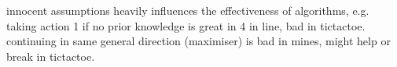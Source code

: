 innocent assumptions heavily influences the effectiveness of algorithms, e.g. taking action 1 if no prior knowledge is great in 4 in line, bad in tictactoe. continuing in same general direction (maximiser) is bad in mines, might help or break in tictactoe.